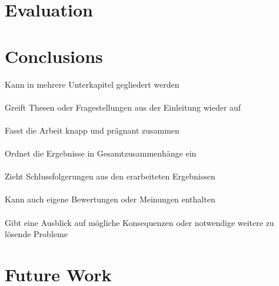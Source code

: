 \documentclass[11pt,oneside,openright]{mpreport}
\begin{document}
\chapter{Evaluation}
\chapter{Conclusions}
Kann in mehrere Unterkapitel gegliedert werden\\\\
Greift Thesen oder Fragestellungen aus der Einleitung wieder auf\\\\
Fasst die Arbeit knapp und prägnant zusammen\\\\
Ordnet die Ergebnisse in Gesamtzusammenhänge ein\\\\
Zieht Schlussfolgerungen aus den erarbeiteten Ergebnissen\\\\
Kann auch eigene Bewertungen oder Meinungen enthalten\\\\
Gibt eine Ausblick auf mögliche Konsequenzen oder notwendige weitere zu lösende Probleme
\chapter{Future Work}

\printbibliography
\end{document}
